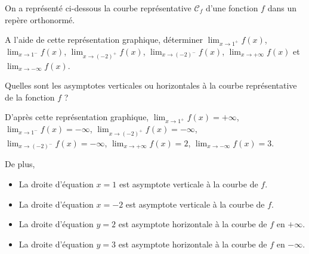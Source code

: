 \documentclass[11pt,fleqn, openany]{book} %
\begin{document}
\begin{exercise}[topic=lim21]On a représenté ci-dessous la courbe représentative $\mathcal{C}_f$ d'une fonction $f$ dans un repère orthonormé.

\begin{minipage}{0.5\linewidth}
\begin{center}
\end{center}
\end{minipage} \hfill \begin{minipage}{0.49\linewidth}
A l'aide de cette représentation graphique, déterminer $\displaystyle \lim_{x \to 1^+} f(x)$, $\displaystyle \lim_{x \to 1^-} f(x)$, $\displaystyle \lim_{x \to (-2)^+} f(x)$, $\displaystyle \lim_{x \to (-2)^-} f(x)$, $\displaystyle \lim_{x \to +\infty} f(x)$ et $\displaystyle \lim_{x \to -\infty} f(x)$.

\vskip10pt

Quelles sont les asymptotes verticales ou horizontales à la courbe représentative de la fonction $f$ ?
\end{minipage}

\end{exercise}

\begin{solution}D'après cette représentation graphique,
 $\displaystyle \lim_{x \to 1^+} f(x)=+\infty$,
$\displaystyle \lim_{x \to 1^-} f(x)=-\infty$, 
 $\displaystyle \lim_{x \to (-2)^+} f(x)=-\infty$,\\  $\displaystyle \lim_{x \to (-2)^-} f(x)=-\infty$,  $\displaystyle \lim_{x \to +\infty} f(x)=2$,
$\displaystyle \lim_{x \to -\infty} f(x)=3$.


De plus,
\begin{itemize}
\item La droite d'équation $x=1$ est asymptote verticale à la courbe de $f$.
\item La droite d'équation $x=-2$ est asymptote verticale à la courbe de $f$.
\item La droite d'équation $y=2$ est asymptote horizontale à la courbe de $f$ en $+\infty$.
\item La droite d'équation $y=3$ est asymptote horizontale à la courbe de $f$ en $-\infty$.
\end{itemize}\end{solution}
\end{document}
